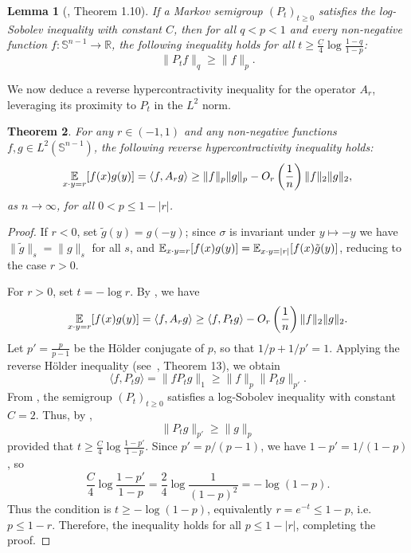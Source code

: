 \documentclass[11pt]{article}
\newtheorem{theorem}{Theorem}[section]
\newtheorem{lemma}[theorem]{Lemma}
\newcommand{\R}{\mathbb{R}} %
\newcommand{\E}{\mathop{\mathbb E\/}}
\newcommand{\sn}{{\mathbb{S}^{n-1} }}
\begin{document}
\begin{lemma}[\cite{mossel2013reverse}, Theorem 1.10]
\label{lem: reverse hypercontractivity of P}
If a Markov semigroup \( (P_t)_{t \geq 0} \) satisfies the log-Sobolev inequality with constant \( C \), then for all \( q < p < 1 \) and every non-negative function \( f: \sn \to \R \), the following inequality holds for all \( t \geq \frac{C}{4} \log \frac{1 - q}{1 - p} \):
\[
\|P_t f\|_q \geq \|f\|_p.
\]
\end{lemma}

We now deduce a reverse hypercontractivity inequality for the operator \( A_r \), leveraging its proximity to \( P_t \) in the \( L^2 \) norm.

\begin{theorem}
\label{thm: two function reverse hypercontractivity}
For any $r \in (-1,1)$ and any non-negative functions \( f, g \in L^2(\sn) \), the following reverse hypercontractivity inequality holds:
\[
\E_{x \cdot y = r}[f(x) g(y)] = \langle f, A_r g \rangle \geq \|f\|_p \|g\|_p - O_r\left(\frac{1}{n}\right) \|f\|_2 \|g\|_2,
\]
as \( n \to \infty \), for all \( 0 < p \leq 1 - |r| \).
\end{theorem}

\begin{proof}
If $r < 0$, set $\tilde{g}(y) = g(-y)$; since $\sigma$ is invariant under $y \mapsto -y$ we have $\|\tilde{g}\|_s = \|g\|_s$ for all $s$, and $\E_{x \cdot y = r}[f(x)g(y)] = \E_{x \cdot y = |r|}[f(x)\tilde{g}(y)]$, reducing to the case $r > 0$.

For $r > 0$, set $t = -\log r$. By , we have
\[
\E_{x\cdot y=r}[f(x)g(y)]=\langle f, A_r g \rangle \geq \langle f, P_t g \rangle - O_r\left(\frac{1}{n}\right) \|f\|_2 \|g\|_2.
\]
Let \( p' = \frac{p}{p - 1} \) be the Hölder conjugate of \( p \), so that \( 1/p + 1/p' = 1 \). Applying the reverse Hölder inequality (see~\cite{hardy1952inequalities}, Theorem 13), we obtain
\[
\langle f, P_t g \rangle = \|f P_t g\|_1 \geq \|f\|_p \|P_t g\|_{p'}.
\]
From , the semigroup \( (P_t)_{t \geq 0} \) satisfies a log-Sobolev inequality with constant \( C = 2 \). Thus, by ,
\[
\|P_t g\|_{p'} \geq \|g\|_p
\]
provided that \( t \geq \frac{C}{4} \log \frac{1 - p'}{1 - p} \). Since \( p' = p/(p-1) \), we have \( 1 - p' = 1/(1-p) \), so
\[
\frac{C}{4} \log \frac{1 - p'}{1 - p} = \frac{2}{4} \log \frac{1}{(1-p)^2} = -\log(1-p).
\]
Thus the condition is \( t \geq -\log(1-p) \), equivalently \( r = e^{-t} \leq 1-p \), i.e.\ \( p \leq 1 - r \). Therefore, the inequality holds for all \( p \leq 1 - |r| \), completing the proof.
\end{proof}
\end{document}
